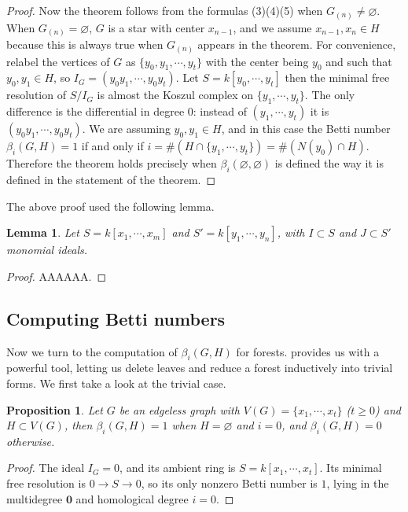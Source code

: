 \documentclass[dvipsnames,10pt]{article}
\newtheorem{lemma}[theorem]{Lemma}
\newtheorem{proposition}[theorem]{Proposition}
\begin{document}
\begin{proof}
    Now the theorem follows from the formulas (3)(4)(5) when $G_{(n)}\neq \varnothing$. When $G_{(n)}= \varnothing$, $G$ is a star with center $x_{n-1}$, and we assume $x_{n-1},x_n\in H$ because this is always true when $G_{(n)}$ appears in the theorem. For convenience, relabel the vertices of $G$ as $\{y_0,y_1,\cdots,y_t\}$ with the center being $y_0$ and such that $y_0,y_1\in H$, so $I_G=(y_0y_1,\cdots,y_0y_t)$. Let $S=k[y_0,\cdots,y_t]$ then the minimal free resolution of $S/I_G$ is almost the Koszul complex on $\{y_1,\cdots,y_t\}$. The only difference is the differential in degree $0$: instead of $(y_1,\cdots,y_t)$ it is $(y_0y_1,\cdots,y_0y_t)$. We are assuming $y_0,y_1\in H$, and in this case the Betti number $\beta_i(G,H)=1$ if and only if $i=\#(H\cap \{y_1,\cdots,y_t\})=\#(N(y_0)\cap H)$. Therefore the theorem holds precisely when $\beta_i(\varnothing,\varnothing)$ is defined the way it is defined in the statement of the theorem.
\end{proof}

The above proof used the following lemma.

\begin{lemma}
    Let $S=k[x_1,\cdots,x_m]$ and $S'=k[y_1,\cdots,y_n]$, with $I\subset S$ and $J\subset S'$ monomial ideals. 
\end{lemma}

\begin{proof}
    AAAAAA.
\end{proof}

\subsection{Computing Betti numbers}

Now we turn to the computation of $\beta_i(G,H)$ for forests.  provides us with a powerful tool, letting us delete leaves and reduce a forest inductively into trivial forms. We first take a look at the trivial case.

\begin{proposition}
    Let $G$ be an edgeless graph with $V(G)=\{x_1,\cdots,x_t\}$ ($t\geqslant 0$) and $H\subset V(G)$, then $\beta_i(G,H)=1$ when $H=\varnothing$ and $i=0$, and $\beta_i(G,H)=0$ otherwise.
\end{proposition}

\begin{proof}
    The ideal $I_G=0$, and its ambient ring is $S=k[x_1,\cdots,x_t]$. Its minimal free resolution is $0\to S\to 0$, so its only nonzero Betti number is $1$, lying in the multidegree $\mathbf{0}$ and homological degree $i=0$.
\end{proof}
\end{document}
